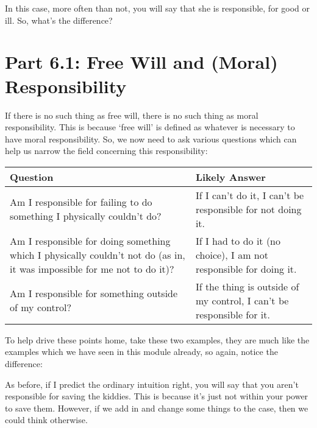
In this case, more often than not, you will say that she is responsible, for good or ill. So, what's the difference?  
\section{Part 6.1:  Free Will and (Moral) Responsibility}

If there is no such thing as free will, there is no such thing as moral responsibility. This is because ‘free will’ is defined as whatever is necessary to have moral responsibility. So, we now need to ask various questions which can help us narrow the field concerning this responsibility:
\noindent
\begin{tabular}{p{2.75in}|p{2.75in}|}
Question&Likely Answer\\\hline
Am I responsible for failing to do something I physically couldn’t do?&If I can't do it, I can't be responsible for not doing it.\\
\hline
Am I responsible for doing something which I physically couldn’t not do (as in, it was impossible for me not to do it)?&If I had to do it (no choice), I am not responsible for doing it.\\
\hline
Am I responsible for something outside of my control?&If the thing is outside of my control, I can’t be responsible for it.
\end{tabular}

To help drive these points home, take these two examples, they are much like the examples which we have seen in this module already, so again, notice the difference:


As before, if I predict the ordinary intuition right, you will say that you aren't responsible for saving the kiddies. This is because it's just not within your power to save them. However, if we add in and change some things to the case, then we could think otherwise.

